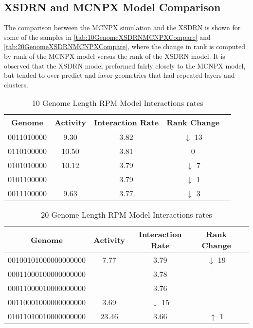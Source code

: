 \subsection{XSDRN and MCNPX Model Comparison}
The comparison between the MCNPX simulation and the XSDRN is shown for some of the samples in \autoref{tab:10GenomeXSDRNMCNPXCompare} and \autoref{tab:20GenomeXSDRNMCNPXCompare}, where the change in rank is computed by rank of the MCNPX model versus the rank of the XSDRN model.
It is observed that the XSDRN model preformed fairly closely to the MCNPX model, but tended to over predict and favor geometries that had repeated layers and clusters.
\begin{table}
  \caption[10 Genome Length RPM Model]{10 Genome Length RPM Model Interactions rates}
  \label{tab:10GenomeXSDRNMCNPXCompare}
  \begin{tabular}{c c | c c | c}
    \toprule
    Genome & Activity & Interaction Rate & Rank Change \\
    \midrule
  0011010000& 9.30 &  3.82 & $\downarrow$ 13 \\
  0110100000 & 10.50  &  3.81 & 0 \\
  0101010000 & 10.12  & 3.79 & $\downarrow$ 7 \\
 0101100000 &  & 3.79 & $\downarrow$ 1\\
  0011100000 & 9.63 &  3.77 & $\downarrow$ 3 \\
    \bottomrule
  \end{tabular}
\end{table}
\begin{table}
  \caption[20 Genome Length RPM Model]{20 Genome Length RPM Model Interactions rates}
  \label{tab:20GenomeXSDRNMCNPXCompare}
  \begin{tabular}{c c | c c | c}
    \toprule
    Genome & Activity  & Interaction Rate & Rank Change \\
    \midrule
  00100101000000000000 & 7.77 & 3.79 & $\downarrow$ 19 \\
  00011000100000000000&  & 3.78 &  \\
  00011000010000000000& &  3.76 &  \\
  00110001000000000000 &  3.69 & $\downarrow$ 15\\
  01011010010000000000 & 23.46 & 3.66 & $\uparrow$ 1\\
    \bottomrule
  \end{tabular}
\end{table}

